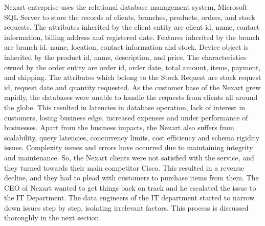 \documentclass[a4Paper,12pt]{report}
\begin{document}
Nexart enterprise uses the relational database management system, Microsoft SQL Server to store the records of clients, branches, products, orders, and stock requests. The attributes inherited by the client entity are client id, name, contact information, billing address and registered date. Features inherited by the branch are branch id, name, location, contact information and stock. Device object is inherited by the product id, name, description, and price. The characteristics owned by the order entity are order id, order date, total amount, items, payment, and shipping. The attributes which belong to the Stock Request are stock request id, request date and quantity requested. As the customer base of the Nexart grew rapidly, the databases were unable to handle the requests from clients all around the globe. This resulted in latencies in database operation, lack of interest in customers, losing business edge, increased expenses and under performance of businesses. Apart from the business impacts, the Nexart also suffers from scalability, query latencies, concurrency limits, cost efficiency and schema rigidity issues. Complexity issues and errors have occurred due to maintaining integrity and maintenance. So, the Nexart clients were not satisfied with the service, and they turned towards their main competitor Cisco. This resulted in a revenue decline, and they had to plead with customers to purchase items from them. The CEO of Nexart wanted to get things back on track and he escalated the issue to the IT Department. The data engineers of the IT department started to narrow down issues step by step, isolating irrelevant factors. This process is discussed thoroughly in the next section.
\end{document}
